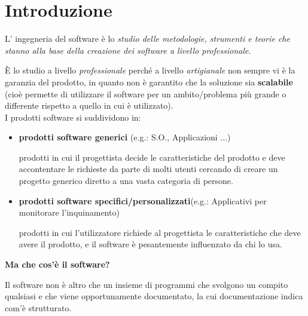 \documentclass[a4paper, 10pt]{article}
\begin{document}
	\begin{frontespizio}
	\end{frontespizio}
	\tableofcontents
	\thispagestyle{empty}
	
	\newpage
	
	\section{Introduzione}
	L' ingegneria del software è lo \textit{studio delle metodologie, strumenti e teorie che
		stanno alla base della creazione dei software a livello professionale}.
	
	\noindent
	È lo studio a livello \textit{professionale} perché a livello \textit{artigianale} non sempre vi è la garanzia del prodotto, in quanto non è garantito che la soluzione sia \textbf{scalabile} (cioè
	permette di utilizzare il software per un ambito/problema più grande o differente rispetto a quello in cui è utilizzato).\\
	I prodotti software si suddividono in:
	\begin{itemize}
		\item \textbf{prodotti software generici} (e.g.: S.O., Applicazioni ...)
		
		prodotti in cui il progettista decide le caratteristiche del prodotto e deve accontentare le richieste da parte di molti utenti cercando di creare un progetto generico diretto a  una vasta categoria di persone.
		\item \textbf{prodotti software specifici/personalizzati}(e.g.: Applicativi per monitorare l'inquinamento)
		
		prodotti in cui l'utilizzatore richiede al progettista le caratteristiche che deve avere il prodotto, e il software è pesantemente influenzato da chi lo usa.
	\end{itemize}
	
	\noindent
	\textbf{Ma che cos'è il software?} 
	
	\noindent
	Il software non è altro che un insieme di programmi che svolgono un compito qualsiasi e che viene opportunamente documentato, la cui documentazione indica com'è strutturato. \\
	
	\noindent
\end{document}

